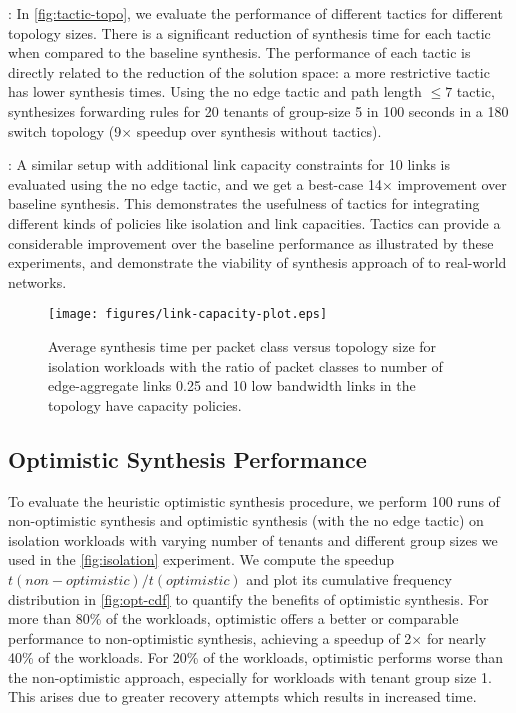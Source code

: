 : 
In \cref{fig:tactic-topo},
 we evaluate the performance of different tactics for different topology sizes. There is a
 significant reduction of synthesis time for each tactic when compared to the baseline synthesis.
 The performance of each tactic is directly related to the reduction of the solution space: a more
 restrictive tactic has lower synthesis times. 
  Using the no edge tactic
 and path length $\leq 7$ tactic, \Name synthesizes forwarding rules for 20 tenants of group-size 5 in 100 seconds in a 180 switch
 topology (9$\times$ speedup over synthesis without tactics).
  
 : A similar setup
 with additional link capacity constraints for 10 links is evaluated
 using the no edge tactic, and we get a best-case 14$\times$
 improvement over baseline synthesis. This demonstrates the usefulness
 of tactics for integrating different kinds of policies like isolation
 and link capacities.  Tactics can provide a considerable improvement
 over the baseline performance as illustrated by these experiments,
 and demonstrate the viability of synthesis approach of \Name to
 real-world networks.
 
\begin{figure}[h]
	\centering
	\texttt{[image: figures/link-capacity-plot.eps]}
	\caption{Average synthesis time per packet class versus topology size for isolation workloads 
		with the ratio of packet classes to number of edge-aggregate links 0.25 and 10 low bandwidth links in the topology 
		have capacity policies.}
	\label{fig:link-capacity}
\end{figure}


\subsection{Optimistic Synthesis
  Performance} \label{sec:optimisticeval} To evaluate the heuristic
optimistic synthesis procedure, we perform 100 runs of non-optimistic
synthesis and optimistic synthesis (with the no edge tactic) on
isolation workloads with varying number of tenants and different group
sizes we used in the \cref{fig:isolation} experiment. We compute the
speedup $t(non-optimistic)/t(optimistic)$ and plot its cumulative
frequency distribution in \cref{fig:opt-cdf} to quantify the benefits
of optimistic synthesis. For more than 80\% of the workloads,
optimistic offers a better or comparable performance to non-optimistic
synthesis, achieving a speedup of 2$\times$ for nearly 40\% of the
workloads. For 20\% of the workloads, optimistic performs worse than
the non-optimistic approach, especially for workloads with tenant
group size 1.  This arises due to greater recovery attempts which
results in increased time.

